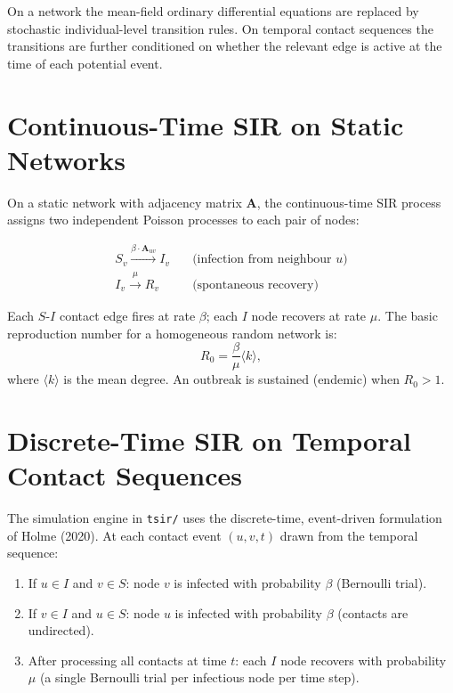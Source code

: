 \documentclass[12pt,a4paper]{report}
\begin{document}
On a network the mean-field ordinary differential equations are replaced by
stochastic individual-level transition rules. On temporal contact sequences the
transitions are further conditioned on whether the relevant edge is active at
the time of each potential event.

\section{Continuous-Time SIR on Static Networks}

On a static network with adjacency matrix $\mathbf{A}$, the continuous-time SIR
process assigns two independent Poisson processes to each pair of nodes:

\begin{align}
  S_v \xrightarrow{\beta \cdot \mathbf{A}_{uv}} I_v & \quad \text{(infection from neighbour } u \text{)} \\
  I_v \xrightarrow{\mu} R_v & \quad \text{(spontaneous recovery)}
\end{align}

Each $S$-$I$ contact edge fires at rate $\beta$; each $I$ node recovers at rate
$\mu$. The basic reproduction number for a homogeneous random network is:
\begin{equation}
  R_0 = \frac{\beta}{\mu} \langle k \rangle,
  \label{eq:r0}
\end{equation}
where $\langle k \rangle$ is the mean degree. An outbreak is sustained (endemic)
when $R_0 > 1$.

\section{Discrete-Time SIR on Temporal Contact Sequences}

The simulation engine in \texttt{tsir/} uses the discrete-time, event-driven
formulation of Holme (2020). At each contact event $(u, v, t)$ drawn from the
temporal sequence:

\begin{enumerate}
  \item If $u \in I$ and $v \in S$: node $v$ is infected with probability $\beta$
    (Bernoulli trial).
  \item If $v \in I$ and $u \in S$: node $u$ is infected with probability $\beta$
    (contacts are undirected).
  \item After processing all contacts at time $t$: each $I$ node recovers with
    probability $\mu$ (a single Bernoulli trial per infectious node per time step).
\end{enumerate}
\end{document}
